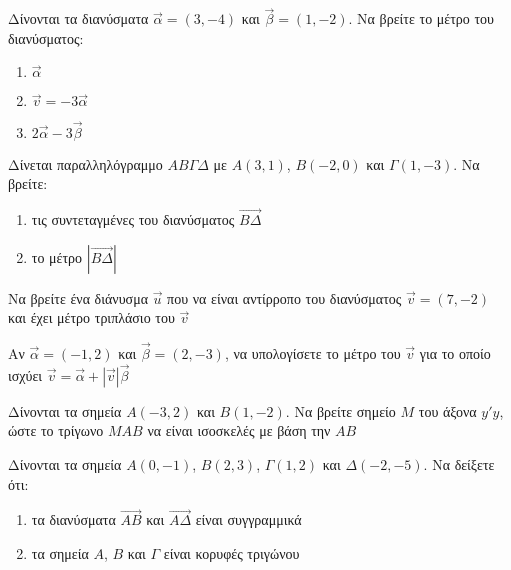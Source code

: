 \documentclass{../../presentation}
\begin{document}
\begin{askisi}
  Δίνονται τα διανύσματα $\vec{α}=(3,-4)$ και $\vec{β}=(1,-2)$. Να βρείτε το μέτρο του διανύσματος:
  \begin{enumerate}
    \item<1-> $\vec{α}$
    \item<2-> $\vec{v}=-3\vec{α}$
    \item<3-> $2\vec{α}-3\vec{β}$
  \end{enumerate}

\end{askisi}

\begin{askisi}
  Δίνεται παραλληλόγραμμο $ΑΒΓΔ$ με $Α(3,1)$, $Β(-2,0)$ και $Γ(1,-3)$. Να βρείτε:
  \begin{enumerate}
    \item<1-> τις συντεταγμένες του διανύσματος $\overrightarrow{ΒΔ}$
    \item<2-> το μέτρο $|\overrightarrow{ΒΔ}|$
  \end{enumerate}

\end{askisi}

\begin{askisi}
  Να βρείτε ένα διάνυσμα $\vec{u}$ που να είναι αντίρροπο του διανύσματος $\vec{v}=(7,-2)$ και έχει μέτρο τριπλάσιο του $\vec{v}$

\end{askisi}

\begin{askisi}
  Αν $\vec{α}=(-1,2)$ και $\vec{β}=(2,-3)$, να υπολογίσετε το μέτρο του $\vec{v}$ για το οποίο ισχύει $\vec{v}=\vec{α}+|\vec{v}|\vec{β}$

\end{askisi}

\begin{askisi}
  Δίνονται τα σημεία $Α(-3,2)$ και $Β(1,-2)$. Να βρείτε σημείο $Μ$ του άξονα $y'y$, ώστε το τρίγωνο $ΜΑΒ$ να είναι ισοσκελές με βάση την $ΑΒ$

\end{askisi}

\begin{askisi}
  Δίνονται τα σημεία $Α(0,-1)$, $Β(2,3)$, $Γ(1,2)$ και $Δ(-2,-5)$. Να δείξετε ότι:
  \begin{enumerate}
    \item<1-> τα διανύσματα $\overrightarrow{ΑΒ}$ και $\overrightarrow{ΑΔ}$ είναι συγγραμμικά
    \item<2-> τα σημεία $Α$, $Β$ και $Γ$ είναι κορυφές τριγώνου
  \end{enumerate}

\end{askisi}
\end{document}
